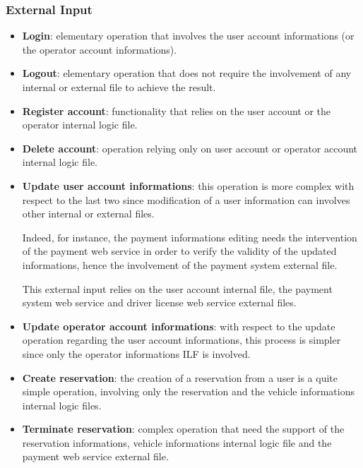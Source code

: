 \subsubsection{External Input}

\begin{itemize}
	\item \textbf{Login}: elementary operation that involves the user account informations (or the operator account informations).

	\item \textbf{Logout}: elementary operation that does not require the involvement of any internal or external file to achieve the result.

	\item \textbf{Register account}: functionality that relies on the user account or the operator internal logic file.

	\item \textbf{Delete account}: operation relying only on user account or operator account internal logic file.

	\item \textbf{Update user account informations}: this operation is more complex with respect to the last two since modification of a user information can involves other internal or external files. 

Indeed, for instance, the payment informations editing needs the intervention of the payment web service in order to verify the validity of the updated informations, hence the involvement of the payment system external file.

This external input relies on the user account internal file, the payment system web service and driver license web service external files.

	\item \textbf{Update operator account informations}: with respect to the update operation regarding the user account informations, this process is simpler since only the operator informations ILF is involved.

	\item \textbf{Create reservation}: the creation of a reservation from a user is a quite simple operation, involving only the reservation and the vehicle informations internal logic files.

	\item \textbf{Terminate reservation}: complex operation that need the support of the reservation informations, vehicle informations internal logic file and the payment web service external file.


\end{itemize}
